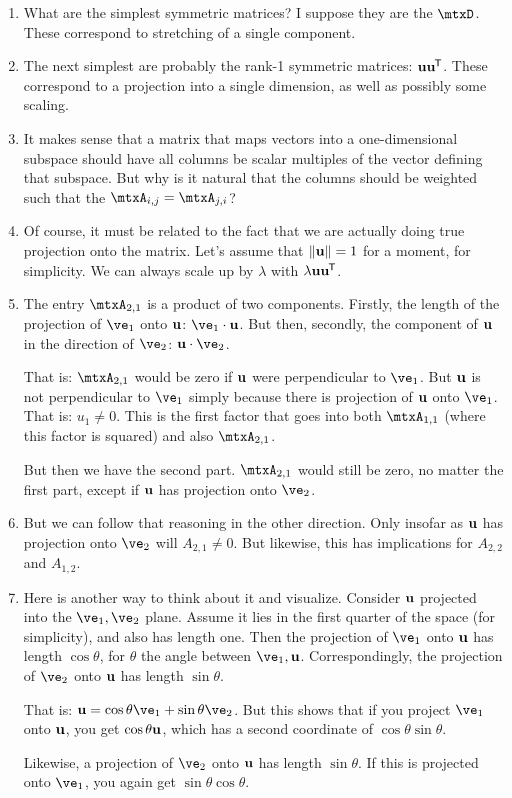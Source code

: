 \documentclass[11pt, oneside]{amsart}
\begin{document}
\begin{enumerate}
  \item What are the simplest symmetric matrices? I suppose they are the
   $\mtxD$. These correspond to stretching of
  a single component.

  \item The next simplest are probably the rank-1 symmetric matrices:
  $\bm{\mathrm{u}} \bm{\mathrm{u}}^{\mkern-1.5mu\mathsf{T}}$. These correspond to a projection into a single
  dimension, as well as possibly some scaling.

  \item It makes sense that a matrix that maps vectors into a
  one-dimensional subspace should have all columns be scalar multiples
  of the vector defining that subspace. But why is it natural that the
  columns should be weighted such that the $\mtxA_{i, j} = \mtxA_{j,
  i}$?

  \item Of course, it must be related to the fact that we are actually
  doing true projection onto the matrix. Let's assume that $\left\Vert \bm{\mathrm{u}} \right\Vert =
  1$ for a moment, for simplicity. We can always scale up by $\lambda$
  with $\lambda \bm{\mathrm{u}}\bm{\mathrm{u}}^{\mkern-1.5mu\mathsf{T}}$.

  \item The entry $\mtxA_{2, 1}$ is a product of two components. Firstly,
  the length of the projection of $\ve_1$ onto $\bm{\mathrm{u}}$: $\ve_1 \cdot \vu$.
  But then, secondly, the component of $\bm{\mathrm{u}}$ in the direction of
  $\ve_2$: $\vu \cdot \ve_2$.

  That is: $\mtxA_{2, 1}$ would be zero if $\bm{\mathrm{u}}$ were perpendicular to
  $\ve_1$. But $\bm{\mathrm{u}}$ is not perpendicular to $\ve_1$ simply because
  there is projection of $\bm{\mathrm{u}}$ onto $\ve_1$. That is: $u_1 \ne 0$. This
  is the first factor that goes into both $\mtxA_{1, 1}$ (where this
  factor is squared) and also $\mtxA_{2, 1}$.

  But then we have the second part. $\mtxA_{2, 1}$ would still be zero,
  no matter the first part, except if $\bm{\mathrm{u}}$ has projection onto $\ve_2$.

  \item But we can follow that reasoning in the other direction. Only
  insofar as $\bm{\mathrm{u}}$ has projection onto $\ve_2$ will $A_{2, 1} \ne 0$.
  But likewise, this has implications for $A_{2, 2}$ and $A_{1, 2}$.

  \item Here is another way to think about it and visualize. Consider
  $\bm{\mathrm{u}}$ projected into the $\ve_1, \ve_2$ plane. Assume it lies in the
  first quarter of the space (for simplicity), and also has length one.
  Then the projection of $\ve_1$ onto $\bm{\mathrm{u}}$ has length $\cos\theta$, for
  $\theta$ the angle between $\ve_1, \vu$. Correspondingly, the
  projection of $\ve_2$ onto $\bm{\mathrm{u}}$ has length $\sin\theta$.

  That is: $\vu = \cos\theta \ve_1 + \sin\theta \ve_2$. But this shows
  that if you project $\ve_1$ onto $\bm{\mathrm{u}}$, you get $\cos\theta \bm{\mathrm{u}}$,
  which has a second coordinate of $\cos\theta \sin\theta$.

  Likewise, a projection of $\ve_2$ onto $\bm{\mathrm{u}}$ has length $\sin\theta$.
  If this is projected onto $\ve_1$, you again get $\sin\theta
  \cos\theta$.
\end{enumerate}
\end{document}
